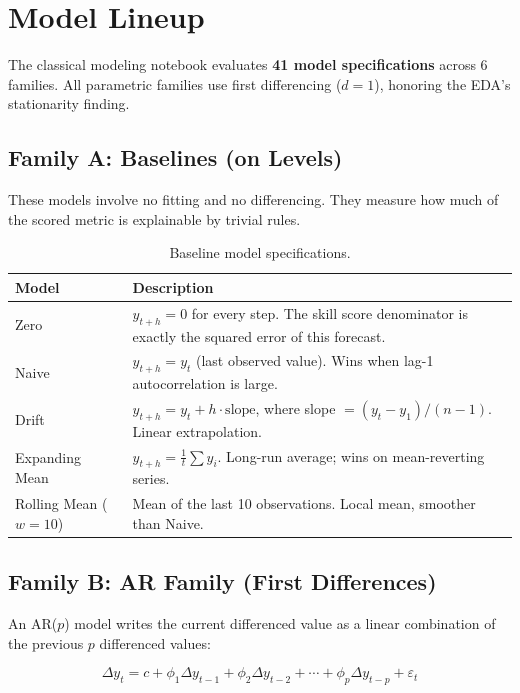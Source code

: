 \section{Model Lineup}

The classical modeling notebook evaluates \textbf{41 model specifications} across 6 families. All parametric families use first differencing ($d = 1$), honoring the EDA's stationarity finding.

\subsection{Family A: Baselines (on Levels)}

These models involve no fitting and no differencing. They measure how much of the scored metric is explainable by trivial rules.

\begin{table}[H]
\centering
\caption{Baseline model specifications.}
\begin{tabular}{lp{8cm}}
\toprule
\textbf{Model} & \textbf{Description} \\
\midrule
Zero & $\hat{y}_{t+h} = 0$ for every step. The skill score denominator is exactly the squared error of this forecast. \\
Naive & $\hat{y}_{t+h} = y_t$ (last observed value). Wins when lag-1 autocorrelation is large. \\
Drift & $\hat{y}_{t+h} = y_t + h \cdot \text{slope}$, where slope $= (y_t - y_1)/(n-1)$. Linear extrapolation. \\
Expanding Mean & $\hat{y}_{t+h} = \frac{1}{t}\sum y_i$. Long-run average; wins on mean-reverting series. \\
Rolling Mean ($w=10$) & Mean of the last 10 observations. Local mean, smoother than Naive. \\
\bottomrule
\end{tabular}
\end{table}

\subsection{Family B: AR Family (First Differences)}

An AR($p$) model writes the current differenced value as a linear combination of the previous $p$ differenced values:

\begin{equation}
\Delta y_t = c + \phi_1 \Delta y_{t-1} + \phi_2 \Delta y_{t-2} + \cdots + \phi_p \Delta y_{t-p} + \varepsilon_t
\end{equation}


